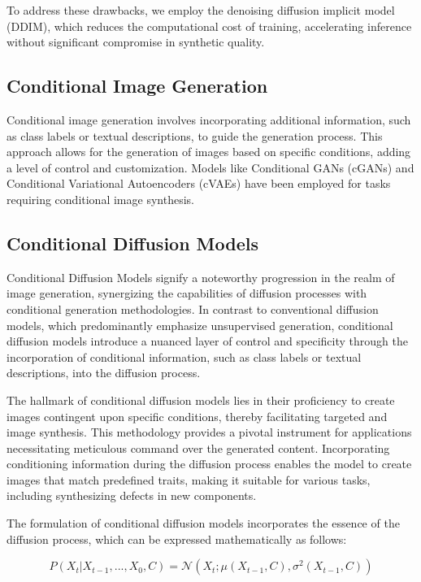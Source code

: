 To address these drawbacks, we employ the denoising diffusion implicit model (DDIM)\cite{DDIM}, which reduces the computational cost of training, accelerating inference without significant compromise in synthetic quality.

\subsection{Conditional Image Generation}
Conditional image generation involves incorporating additional information, such as class labels or textual descriptions, to guide the generation process. This approach allows for the generation of images based on specific conditions, adding a level of control and customization. Models like Conditional GANs (cGANs) and Conditional Variational Autoencoders (cVAEs) have been employed for tasks requiring conditional image synthesis.

\subsection{Conditional Diffusion Models}
Conditional Diffusion Models\cite{BeatGAN,CDM1,CDM2,CDM3,classifier_free} signify a noteworthy progression in the realm of image generation, synergizing the capabilities of diffusion processes with conditional generation methodologies. In contrast to conventional diffusion models, which predominantly emphasize unsupervised generation, conditional diffusion models introduce a nuanced layer of control and specificity through the incorporation of conditional information, such as class labels or textual descriptions, into the diffusion process.

The hallmark of conditional diffusion models lies in their proficiency to create images contingent upon specific conditions, thereby facilitating targeted and image synthesis. This methodology provides a pivotal instrument for applications necessitating meticulous command over the generated content. Incorporating conditioning information during the diffusion process enables the model to create images that match predefined traits, making it suitable for various tasks, including synthesizing defects in new components.

The formulation of conditional diffusion models incorporates the essence of the diffusion process, which can be expressed mathematically as follows:

\[ P(X_t | X_{t-1}, ..., X_0, C) = \mathcal{N}(X_t; \mu(X_{t-1}, C), \sigma^2(X_{t-1}, C)) \]


